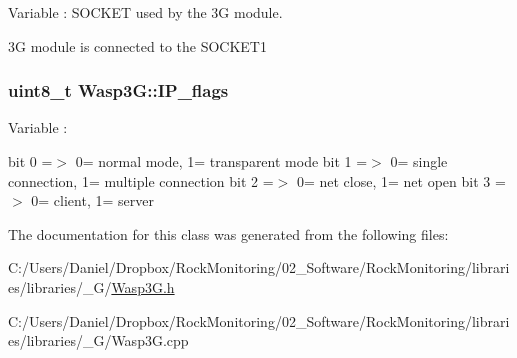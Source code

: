 Variable \+: S\+O\+C\+K\+ET used by the 3G module. 

3G module is connected to the S\+O\+C\+K\+E\+T1 
\subsubsection[{\texorpdfstring{I\+P\+\_\+flags}{IP_flags}}]{\setlength{\rightskip}{0pt plus 5cm}uint8\+\_\+t Wasp3\+G\+::\+I\+P\+\_\+flags}\hypertarget{class_wasp3_g_a00c6706ec6556fa6f4e4add6d5a549cc}{}\label{class_wasp3_g_a00c6706ec6556fa6f4e4add6d5a549cc}


Variable \+: 

bit 0 =$>$ \textquotesingle{}0\textquotesingle{}= normal mode, \textquotesingle{}1\textquotesingle{}= transparent mode bit 1 =$>$ \textquotesingle{}0\textquotesingle{}= single connection, \textquotesingle{}1\textquotesingle{}= multiple connection bit 2 =$>$ \textquotesingle{}0\textquotesingle{}= net close, \textquotesingle{}1\textquotesingle{}= net open bit 3 =$>$ \textquotesingle{}0\textquotesingle{}= client, \textquotesingle{}1\textquotesingle{}= server 

The documentation for this class was generated from the following files\+:\begin{DoxyCompactItemize}
\item 
C\+:/\+Users/\+Daniel/\+Dropbox/\+Rock\+Monitoring/02\+\_\+\+Software/\+Rock\+Monitoring/libraries/libraries/\+\_\+G/\hyperlink{_wasp3_g_8h}{Wasp3\+G.\+h}\item 
C\+:/\+Users/\+Daniel/\+Dropbox/\+Rock\+Monitoring/02\+\_\+\+Software/\+Rock\+Monitoring/libraries/libraries/\+\_\+G/Wasp3\+G.\+cpp\end{DoxyCompactItemize}
